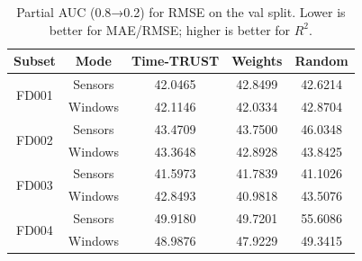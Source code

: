 \begin{table}[t]
\centering
\caption{Partial AUC (0.8→0.2) for RMSE on the val split. Lower is better for MAE/RMSE; higher is better for $R^2$.}
\label{tab:auc_rmse_val}
\begin{tabular}{|c|c|c|c|c|}
\hline
Subset & Mode & Time-TRUST & Weights & Random \\
\hline
\multirow{2}{*}{FD001} & Sensors & 42.0465 & 42.8499 & 42.6214 \\
 & Windows & 42.1146 & 42.0334 & 42.8704 \\
\hline
\multirow{2}{*}{FD002} & Sensors & 43.4709 & 43.7500 & 46.0348 \\
 & Windows & 43.3648 & 42.8928 & 43.8425 \\
\hline
\multirow{2}{*}{FD003} & Sensors & 41.5973 & 41.7839 & 41.1026 \\
 & Windows & 42.8493 & 40.9818 & 43.5076 \\
\hline
\multirow{2}{*}{FD004} & Sensors & 49.9180 & 49.7201 & 55.6086 \\
 & Windows & 48.9876 & 47.9229 & 49.3415 \\
\hline
\end{tabular}
\end{table}
